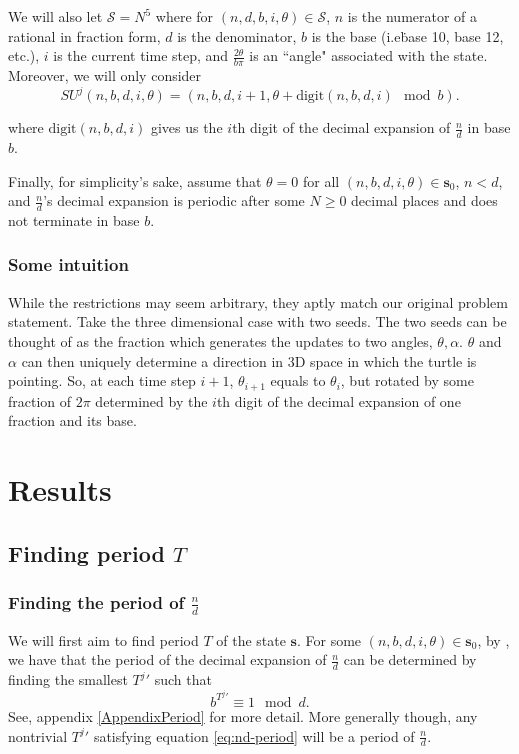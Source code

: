 \documentclass[11pt,titlepage]{article}
\begin{document}
We will also let $\mathcal{S} = N^5$ where for $(n, d, b, i, \theta) \in \mathcal{S}$,
$n$ is the numerator of a rational in fraction form, $d$ is the denominator, 
$b$ is the base (i.e\. base 10, base 12, etc.), $i$ is the current time step,
and $\frac{2\theta}{b \pi}$ is an ``angle" associated with the state.
Moreover, we will only consider
$$
  SU^j(n, b, d, i, \theta) = (n, b, d, i + 1, \theta + \mathrm{digit}(n, b, d, i) \mod b).
$$

where $\mathrm{digit}(n, b, d, i)$ gives us the $i$th digit of the decimal expansion of $\frac{n}{d}$
in base $b$.

Finally, for simplicity's sake, assume that $\theta = 0$ for all $(n, b, d, i, \theta) \in \pmb{s}_0$,
$n < d$, and $\frac{n}{d}$'s decimal expansion is periodic after some $N \geq 0$ decimal places
and does not terminate in base $b$.

\subsubsection{Some intuition}
While the restrictions may seem arbitrary, they aptly match our original problem statement.
Take the three dimensional case with two seeds. The two seeds can be thought
of as the fraction which generates the updates to two angles, $\theta, \alpha$.
$\theta$ and $\alpha$ can then uniquely determine a direction in 3D space in which the 
turtle is pointing. 
So, at each time step $i + 1$, $\theta_{i + 1}$ equals to $\theta_i$, but rotated by
some fraction of $2 \pi$ determined by the $i$th digit of the decimal expansion of one fraction and its base.



\section{Results}
\subsection{Finding period $T$}
\subsubsection{Finding the period of $\frac{n}{d}$}
We will first aim to find period $T$ of the state $\pmb{s}$.
For some $(n, b, d, i, \theta) \in \pmb{s}_0$, by \cite{MathOverflowFracPeriod},
we have that the period of the decimal expansion of $\frac{n}{d}$
can be determined by finding the smallest ${T^j}'$ such that
\begin{equation}
\label{eq:nd-period}
b ^ {{T^j}'} \equiv 1 \mod d.
\end{equation}
See, appendix \ref{AppendixPeriod} for more detail.
More generally though, any nontrivial ${T^j}'$ satisfying equation \ref{eq:nd-period}
will be a period of $\frac{n}{d}$.
\end{document}
